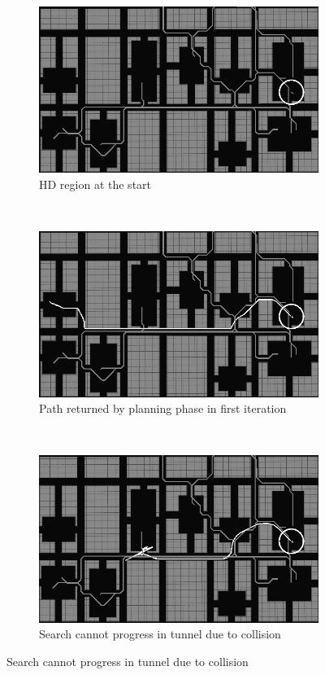 \begin{figure}[ht]
  \centering
  \begin{subfigure}[t]{0.3\linewidth}
    \centering
    \includegraphics[width=\linewidth]{Figures/alg1.png}
    \caption{HD region at the start}
  \end{subfigure}
  ~
  \begin{subfigure}[t]{0.3\linewidth}
    \centering
    \includegraphics[width=\linewidth]{Figures/alg2.png}
    \caption{Path returned by planning phase in first iteration}
  \end{subfigure}
  ~
  \begin{subfigure}[t]{0.3\linewidth}
    \centering
    \includegraphics[width=\linewidth]{Figures/alg3.png}
    \caption{Search cannot progress in tunnel due to collision}
  \end{subfigure}
  

\end{figure}
